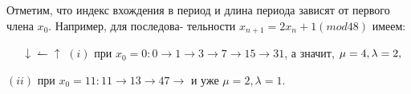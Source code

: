 \begin{mynotice}Отметим, что индекс вхождения в период и длина \linebreak \indent периода зависят от первого члена $x_{0}$. Например, для последова- \linebreak \indent тельности $x_{n+1} = 2x_{n} + 1 (mod 48)$ имеем: \linebreak
 
$\;\;\;\;\; \downarrow \leftharpoonup \uparrow$ \linebreak
\indent $(i)$ при $x_{0} = 0: 0 \to 1 \to 3 \to 7 \to 15 \to 31$, а значит, $\mu = 4, \linebreak \lambda = 2,$ \par 

$(ii)$ при $x_{0} = 11: 11 \to 13 \to 47 \to$ и уже $\mu = 2, \lambda = 1.$ \par 


\end{mynotice}
